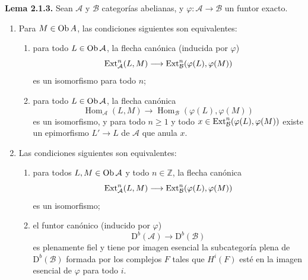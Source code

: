 \providecommand{\sisi}[2]{#2}

\textbf{Lema 2.1.3.} Sean $\mathcal A$ y $\mathcal B$ categorías abelianas, y $\varphi:\mathcal A\to\mathcal B$ un funtor exacto.
\begin{enumerate}[label=\alph*)]
\item Para $M\in\operatorname{Ob} A$, las condiciones siguientes son equivalentes:
\begin{enumerate}[label=(\roman*)]
\item para todo $L\in\operatorname{Ob}\mathcal A$, la flecha canónica (inducida por $\varphi$)
\[
\operatorname{Ext}^n_{\mathcal A}(L,M)\longrightarrow\operatorname{Ext}^n_{\mathcal B}(\varphi(L),\varphi(M))
\]
es un isomorfismo para todo $n$;
\item para todo $L\in\operatorname{Ob}\mathcal A$, la flecha canónica
\[
\operatorname{Hom}_{\mathcal A}(L,M)\longrightarrow\operatorname{Hom}_{\mathcal B}(\varphi(L),\varphi(M))
\]
es un isomorfismo, y para todo $n\ge1$ y todo $x\in\operatorname{Ext}^n_{\mathcal B}(\varphi(L),\varphi(M))$ existe un epimorfismo $L'\to L$ de $\mathcal A$ que anula $x$.
\end{enumerate}
\item Las condiciones siguientes son equivalentes:
\begin{enumerate}[label=(\roman*)]
\item para todos $L,M\in\operatorname{Ob}\mathcal A$ y todo $n\in\mathbb Z$, la flecha canónica
\[
\operatorname{Ext}^n_{\mathcal A}(L,M)\longrightarrow\operatorname{Ext}^n_{\mathcal B}(\varphi(L),\varphi(M))
\]
es un isomorfismo;
\item el funtor canónico (inducido por $\varphi$)
\[
\mathrm D^b(\mathcal A)\longrightarrow\mathrm D^b(\mathcal B)
\]
es plenamente fiel y tiene por imagen esencial la subcategoría plena de $\mathrm D^b(\mathcal B)$ formada por los complejos $F$ tales que $H^i(F)$ esté en la imagen esencial de $\varphi$ para todo $i$.
\end{enumerate}
\end{enumerate}

